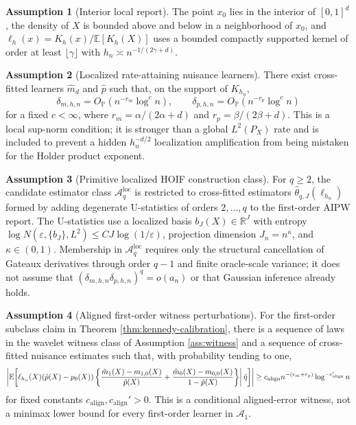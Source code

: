 \documentclass[11pt]{article}
\newcommand{\E}{\mathbb{E}}
\renewcommand{\Pr}{\mathbb{P}}
\theoremstyle{definition}
\newtheorem{assumption}{Assumption}
\theoremstyle{plain}
\theoremstyle{remark}
\begin{document}
\begin{assumption}[Interior local report]\label{ass:local-report}
The point \(x_0\) lies in the interior of \([0,1]^d\), the density of \(X\) is
bounded above and below in a neighborhood of \(x_0\), and
\(\ell_h(x)=K_h(x)/\E[K_h(X)]\) uses a bounded compactly supported kernel of
order at least \(\lfloor\gamma\rfloor\) with
\(h_n\asymp n^{-1/(2\gamma+d)}\).
\end{assumption}

\begin{assumption}[Localized rate-attaining nuisance learners]\label{ass:nuisance-rates}
There exist cross-fitted learners \(\hat m_d\) and \(\hat p\) such that, on
the support of \(K_{h_n}\),
\[
\delta_{m,h,n}=O_{\Pr}(n^{-r_m}\log^c n),\qquad
\delta_{p,h,n}=O_{\Pr}(n^{-r_p}\log^c n)
\]
for a fixed \(c<\infty\), where \(r_m=\alpha/(2\alpha+d)\) and
\(r_p=\beta/(2\beta+d)\).  This is a local sup-norm condition; it is stronger
than a global \(L^2(P_X)\) rate and is included to prevent a hidden
\(h_n^{-d/2}\) localization amplification from being mistaken for the
Holder product exponent.
\end{assumption}

\begin{assumption}[Primitive localized HOIF construction class]\label{ass:higher-order-class}
For \(q\ge2\), the candidate estimator class \(\mathcal A_q^{\mathrm{loc}}\)
is restricted to cross-fitted estimators \(\hat\theta_{q,J}(\ell_{h_n})\)
formed by adding degenerate U-statistics of orders \(2,\ldots,q\) to the
first-order AIPW report.  The U-statistics use a localized basis
\(b_J(X)\in\mathbb R^J\) with entropy \(\log N(\varepsilon,\{b_J\},L^2)
\le C J\log(1/\varepsilon)\), projection dimension \(J_n=n^\kappa\), and
\(\kappa\in(0,1)\).  Membership in \(\mathcal A_q^{\mathrm{loc}}\) requires
only the structural cancellation of Gateaux derivatives through order \(q-1\)
and finite oracle-scale variance; it does not assume that
\((\delta_{m,h,n}\delta_{p,h,n})^q=o(a_n)\) or that Gaussian inference
already holds.
\end{assumption}

\begin{assumption}[Aligned first-order witness perturbations]\label{ass:aligned-witness}
For the first-order subclass claim in Theorem \ref{thm:kennedy-calibration},
there is a sequence of laws in the wavelet witness class of Assumption
\ref{ass:witness} and a sequence of cross-fitted nuisance estimates such that,
with probability tending to one,
\[
\left|\E\!\left[\ell_{h_n}(X)(\hat p(X)-p_0(X))
\left\{ {\hat m_1(X)-m_{1,0}(X)\over \hat p(X)}
       +{\hat m_0(X)-m_{0,0}(X)\over 1-\hat p(X)}\right\}
\middle|\,\hat\eta\right]\right|
\ge c_{\mathrm{align}} n^{-(r_m+r_p)}\log^{-c_{\mathrm{align}}'}n
\]
for fixed constants \(c_{\mathrm{align}},c_{\mathrm{align}}'>0\).  This is a
conditional aligned-error witness, not a minimax lower bound for every
first-order learner in \(\mathcal A_1\).
\end{assumption}
\end{document}
